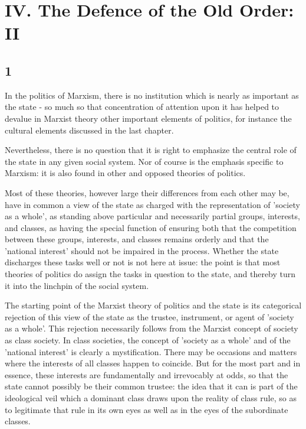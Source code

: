 \chapter*{IV. The Defence of the Old Order: II}


\section*{1}
In the politics of Marxism, there is no institution which is nearly as important as the state - so much so that concentration of attention upon it has helped to devalue in Marxist theory other important elements of politics, for instance the cultural elements discussed in the last chapter.

Nevertheless, there is no question that it is right to emphasize the central role of the state in any given social system. Nor of course is the emphasis specific to Marxism: it is also found in other and opposed theories of politics.

Most of these theories, however large their differences from each other may be, have in common a view of the state as charged with the representation of 'society as a whole', as standing above particular and necessarily partial groups, interests, and classes, as having the special function of ensuring both that the competition between these groups, interests, and classes remains orderly and that the 'national interest' should not be impaired in the process. Whether the state discharges these tasks well or not is not here at issue: the point is that most theories of politics do assign the tasks in question to the state, and thereby turn it into the linchpin of the social system.

The starting point of the Marxist theory of politics and the state is its categorical rejection of this view of the state as the trustee, instrument, or agent of 'society as a whole'. This rejection necessarily follows from the Marxist concept of society as class society. In class societies, the concept of 'society as a whole' and of the 'national interest' is clearly a mystification. There may be occasions and matters where the interests of all classes happen to coincide. But for the most part and in essence, these interests are fundamentally and irrevocably at odds, so that the state cannot possibly be their common trustee: the idea that it can is part of the ideological veil which a dominant class draws upon the reality of class rule, so as to legitimate that rule in its own eyes as well as in the eyes of the subordinate classes.


